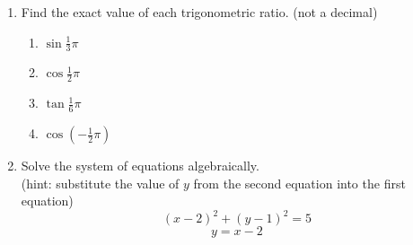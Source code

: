 \documentclass[12pt, twoside]{article}
\begin{document}
\begin{enumerate}
\newpage
\item Find the exact value of each trigonometric ratio. (not a decimal)
    \begin{multicols}{2}
    \begin{enumerate}
        \item $\sin \frac{1}{3}\pi$ \vspace{2cm}
        \item $\cos \frac{1}{2}\pi$ \vspace{2cm}
        \item $\tan \frac{1}{6}\pi$ \vspace{2cm}
        \item $\cos (-\frac{1}{2}\pi)$ \vspace{2cm}
    \end{enumerate}
    \end{multicols}

\item Solve the system of equations algebraically. \\[0.25cm] 
    (hint: substitute the value of $y$ from the second equation into the first equation)
    $$\left(x-2\right)^{2}+\left(y-1\right)^{2}=5$$
    $$y=x-2$$

    
\end{enumerate}
\end{document}
